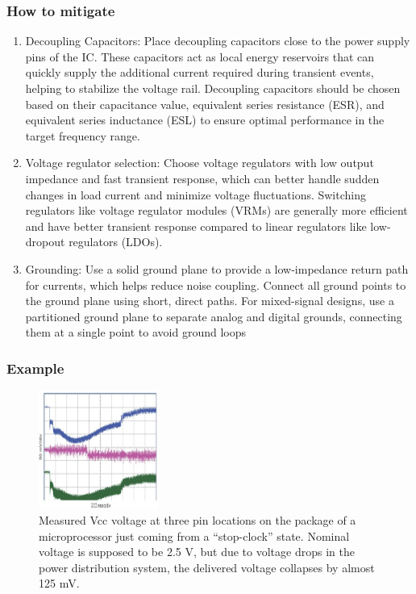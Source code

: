 \documentclass[10pt,hyperref={pdfpagemode=FullScreen},aspectratio=169]{beamer}
\begin{document}
\begin{frame}
  \frametitle{How to mitigate}

\begin{enumerate}
  \item Decoupling Capacitors:
  Place decoupling capacitors close to the power supply pins of the IC. These capacitors act as local energy reservoirs that can quickly supply the additional current required during transient events, helping to stabilize the voltage rail. Decoupling capacitors should be chosen based on their capacitance value, equivalent series resistance (ESR), and equivalent series inductance (ESL) to ensure optimal performance in the target frequency range.
  \item Voltage regulator selection:
  Choose voltage regulators with low output impedance and fast transient response, which can better handle sudden changes in load current and minimize voltage fluctuations. Switching regulators like voltage regulator modules (VRMs) are generally more efficient and have better transient response compared to linear regulators like low-dropout regulators (LDOs).
  \item Grounding:
  Use a solid ground plane to provide a low-impedance return path for currents, which helps reduce noise coupling. Connect all ground points to the ground plane using short, direct paths. For mixed-signal designs, use a partitioned ground plane to separate analog and digital grounds, connecting them at a single point to avoid ground loops
\end{enumerate}


\end{frame}

\begin{frame}
  \frametitle{Example}

  \begin{figure}
    \centering
    \includegraphics[width=0.35\textwidth]{Fig/rail_collapse.png}
    \caption{Measured Vcc voltage at three pin
    locations on the package of a microprocessor just
    coming from a “stop-clock” state. Nominal voltage is
    supposed to be 2.5 V, but due to voltage drops in the
    power distribution system, the delivered voltage
    collapses by almost 125 mV.}
  \end{figure}

\end{frame}
\end{document}
